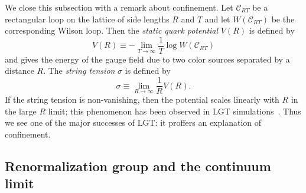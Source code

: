 We close this subsection with a remark about confinement.
Let $\mathcal{C}_{RT}$ be a rectangular loop on the
lattice of side lengths $R$ and $T$ and let $W(\mathcal{C}_{RT})$ be the
corresponding Wilson loop. Then the {\it static quark potential}
 $V(R)$ is defined by
\begin{equation}
  V(R)\equiv-\lim_{T\to\infty}\frac{1}{T}\log W(\mathcal{C}_{RT})  
\end{equation}
and gives the energy of the gauge field due to two color sources separated by
a distance $R$. The {\it string tension} 
$\sigma$ is defined by
\begin{equation}
  \sigma\equiv\lim_{R\to\infty}\frac{1}{R}V(R).
\end{equation}
If the string tension is non-vanishing, then the potential scales linearly 
with $R$ in the large $R$ limit; 
this phenomenon has been observed in LGT 
simulations~\cite{montvay_quantum_1994}.
Thus we see one of the major successes
of LGT: it proffers an explanation of confinement.  

\subsection{Renormalization group and the continuum limit}

